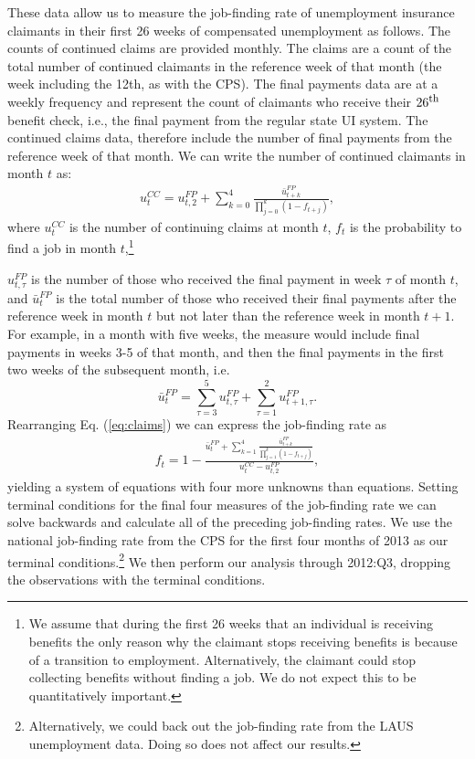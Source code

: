 \documentclass[12pt]{article}
\newcommand{\1}{\mathbf{1}}
\begin{document}
\begin{appendix}
These data allow us to measure the job-finding rate of unemployment insurance claimants in their first 26 weeks of compensated unemployment as follows. The counts of continued claims are provided monthly.  The claims are a count of the total number of continued claimants in the reference week of that month (the week including the 12th, as with the CPS).  The final payments data are at a weekly frequency and represent the count of claimants who receive their $26^{\mbox{\footnotesize th}}$ benefit check, i.e., the final payment from the regular state UI system.  The continued claims data, therefore include the number of final payments from the reference week of that month.  We can write the number of continued claimants in month $t$ as:
\begin{eqnarray}
{u}_t^{CC} = u^{FP}_{t,2} + \sum_{k=0}^4 \frac{\bar{u}_{t+k}^{FP}}{\prod_{j=0}^{k}(1-f_{t+j})}, \label{eq:claims}
\end{eqnarray}
where $u^{CC}_t$ is the number of continuing claims at month $t$, $f_t$ is the probability to find a job in month $t$,\footnote{We assume that during the first 26 weeks that an individual is receiving benefits the only reason why the claimant stops receiving benefits is because of a transition to employment. Alternatively, the claimant could stop collecting benefits without finding a job. We do not expect this to be quantitatively important.}

$u^{FP}_{t,\tau}$ is the number of those who received the final payment in week $\tau$ of month $t$, and $\bar{u}_{t}^{FP}$ is the total number of those who received their final payments after the reference week in month $t$ but not later than the reference week in month $t+1$.  For example, in a month with five weeks, the measure would include final payments in weeks 3-5 of that month, and then the final payments in the first two weeks of the subsequent month, i.e.
\begin{equation*}
\bar{u}_{t}^{FP}=\sum_{\tau=3}^{5}u^{FP}_{t,\tau} + \sum_{\tau=1}^{2}u^{FP}_{t+1,\tau}.
\end{equation*}
Rearranging Eq. (\ref{eq:claims}) we can express the job-finding rate as
\begin{eqnarray}
f_t= 1-\frac{\bar{u}^{FP}_{t}+\sum_{k=1}^4 \frac{\bar{u}_{t+k}^{FP}}{\prod_{j=1}^{k}(1-f_{t+j})}}{{u}_t^{CC}-u^{FP}_{t,2}},
\end{eqnarray}
yielding a system of equations with four more unknowns than equations. Setting terminal conditions for the final four measures of the job-finding rate we can solve backwards and calculate all of the preceding job-finding rates. We use the national job-finding rate from the CPS for the first four months of 2013 as our terminal conditions.\footnote{Alternatively, we could back out the job-finding rate from the LAUS unemployment data.  Doing so does not affect our results.}  We then perform our analysis through 2012:Q3, dropping the observations with the terminal conditions.



\end{appendix}
\end{document}
